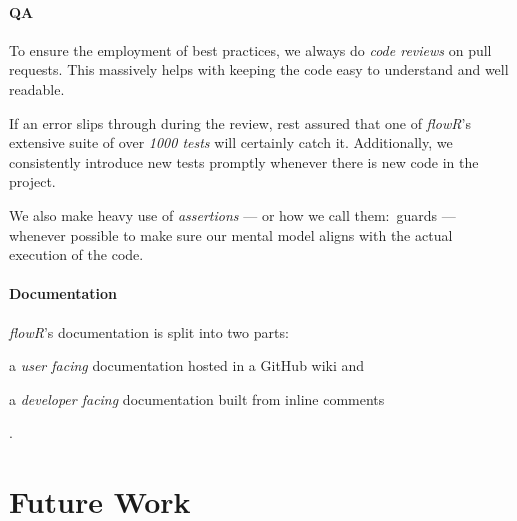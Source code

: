 \documentclass[color,coloraccent=red!60!black]{poster}
\def\flowr{\textit{flowR}}
\begin{document}
\begin{multicols}{3}
	\paragraph{QA} To ensure the employment of best practices, we always do \emph{code
	reviews} on pull requests. This massively helps with keeping the code easy to
	understand and well readable.\par
	If an error slips through during the review, rest assured that one of \flowr's
	extensive suite of over \emph{1000 tests} will certainly catch it. Additionally, we
	consistently introduce new tests promptly whenever there is new code in the
	project.\par
	We also make heavy use of \emph{assertions} --- or how we call them:~guards ---
	whenever possible to make sure our mental model aligns with the actual execution of
	the code.
	\paragraph{Documentation} \flowr's documentation is split into two parts:
	\begin{enumerate*}
		\item a \emph{user facing} documentation hosted in a GitHub wiki and
		\item a \emph{developer facing} documentation built from inline comments
	\end{enumerate*}. %
	\section*{Future Work}
	\lipsum[2]
\end{multicols}
\end{document}
